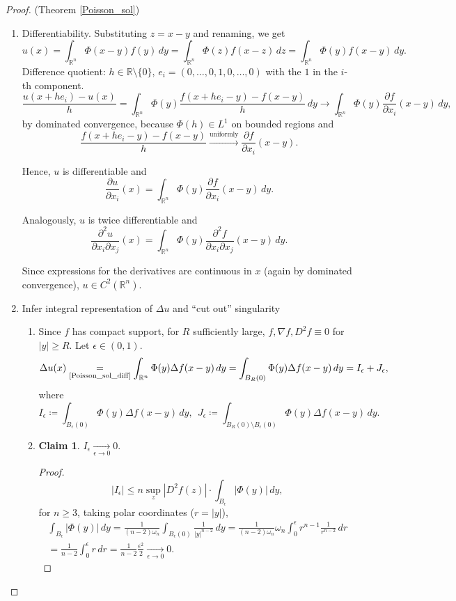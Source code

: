 \documentclass[12pt]{article}
\theoremstyle{definition}
\newtheorem*{claim*}{Claim}
\begin{document}
\begin{proof}
(Theorem \ref{Poisson_sol})

\begin{enumerate}[label=\arabic*.]
\item\label{Poisson_sol_diff} Differentiability. Substituting $z=x-y$ and renaming, we get
\[u(x)=\int_{\mathbb{R}^n}\Phi(x-y)f(y)\,dy=\int_{\mathbb{R}^n}\Phi(z)f(x-z)\,dz=\int_{\mathbb{R}^n}\Phi(y)f(x-y)\,dy.\]
Difference quotient: $h\in\mathbb{R}\setminus\{0\}$, $e_i=(0,\ldots,0,1,0,\ldots,0)$ with the $1$ in the $i$-th component.
\[\frac{u(x+he_i)-u(x)}{h}=\int_{\mathbb{R}^n}\Phi(y)\frac{f(x+he_i-y)-f(x-y)}{h}\,dy\longrightarrow\int_{\mathbb{R}^n}\Phi(y)\frac{\partial f}{\partial x_i}(x-y)\,dy,\]
by dominated convergence, because $\Phi(h)\in L^1$ on bounded regions and
\[\frac{f(x+he_i-y)-f(x-y)}{h}\xrightarrow{\text{uniformly}}\frac{\partial f}{\partial x_i}(x-y).\]

Hence, $u$ is differentiable and
\[\frac{\partial u}{\partial x_i}(x)=\int_{\mathbb{R}^n}\Phi(y)\frac{\partial f}{\partial x_i}(x-y)\,dy.\]

Analogously, $u$ is twice differentiable and
\[\frac{\partial^2u}{\partial x_i\partial x_j}(x)=\int_{\mathbb{R}^n}\Phi(y)\frac{\partial^2f}{\partial x_i\partial x_j}(x-y)\,dy.\]

Since expressions for the derivatives are continuous in $x$ (again by dominated convergence), $u\in C^2(\mathbb{R}^n)$.

\item Infer integral representation of $\Delta u$ and ``cut out'' singularity
\begin{enumerate}[label=(\arabic*)]
\item\label{compact_supp} Since $f$ has compact support, for $R$ sufficiently large, $f,\nabla f,D^2f\equiv0$ for $|y|\geq R$. Let $\epsilon\in(0,1)$.
\[\Delta u(x)\underset{\text{\ref{Poisson_sol_diff}}}{=}\int_{\mathbb{R}^n}\Phi(y)\Delta f(x-y)\,dy=\int_{B_R(0)}\Phi(y)\Delta f(x-y)\,dy=I_{\epsilon}+J_{\epsilon},\]
where
\[I_{\epsilon}\coloneqq\int_{B_{\epsilon}(0)}\Phi(y)\Delta f(x-y)\,dy,\ \ J_{\epsilon}\coloneqq\int_{B_R(0)\setminus B_{\epsilon}(0)}\Phi(y)\Delta f(x-y)\,dy.\]

\item\label{Iepsto0}
\begin{claim*}
$I_{\epsilon}\xrightarrow[\epsilon\to0]{}0$.
\end{claim*}

\begin{proof}
\[|I_{\epsilon}|\leq n\sup_z|D^2f(z)|\cdot\int_{B_{\epsilon}}|\Phi(y)|\,dy,\]
for $n\geq3$, taking polar coordinates ($r=|y|$),
\begin{multline*}
\int_{B_{\epsilon}}|\Phi(y)|\,dy=\frac{1}{(n-2)\omega_n}\int_{B_{\epsilon}(0)}\frac{1}{|y|^{n-2}}\,dy=\frac{1}{(n-2)\omega_n}\omega_n\int_0^{\epsilon}r^{n-1}\frac{1}{r^{n-2}}\,dr\\
=\frac{1}{n-2}\int_0^{\epsilon}r\,dr=\frac{1}{n-2}\frac{\epsilon^2}{2}\xrightarrow[\epsilon\to0]{}0.
\end{multline*}
\end{proof}
\end{enumerate}


\end{enumerate}
\end{proof}
\end{document}
